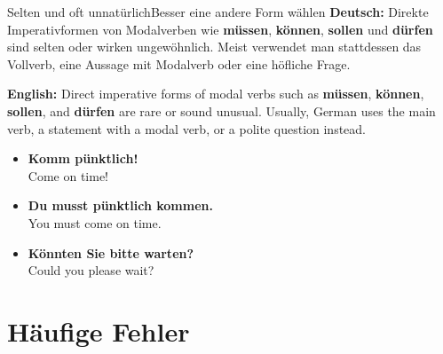 \documentclass[a4paper,11pt]{article}
\newcommand{\GermanText}[1]{\textbf{Deutsch: }#1\par}
\newcommand{\EnglishText}[1]{{\small\color{SoftGray}\textbf{English: }#1\par}}
\newcommand{\ExampleItem}[2]{\item \textbf{#1}\\{\small\color{SoftGray}#2}}
\begin{document}
        \begin{grammarentry}{Selten und oft unnatürlich}{Besser eine andere Form wählen}
            \GermanText{Direkte Imperativformen von Modalverben wie \textbf{müssen}, \textbf{können}, \textbf{sollen} und \textbf{dürfen} sind selten oder wirken ungewöhnlich. Meist verwendet man stattdessen das Vollverb, eine Aussage mit Modalverb oder eine höfliche Frage.}
            \EnglishText{Direct imperative forms of modal verbs such as \textbf{müssen}, \textbf{können}, \textbf{sollen}, and \textbf{dürfen} are rare or sound unusual. Usually, German uses the main verb, a statement with a modal verb, or a polite question instead.}
        \end{grammarentry}

        \begin{exbox}
            \begin{itemize}
                \ExampleItem{Komm pünktlich!}{Come on time!}
                \ExampleItem{Du musst pünktlich kommen.}{You must come on time.}
                \ExampleItem{Könnten Sie bitte warten?}{Could you please wait?}
            \end{itemize}
        \end{exbox}

    \section{Häufige Fehler}
\end{document}

